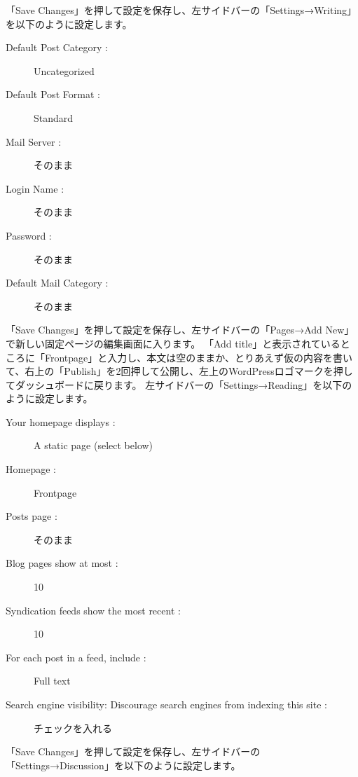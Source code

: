 \documentclass[titlepage,10pt,a4paper,uplatex]{jsbook}
\begin{document}
「Save Changes」を押して設定を保存し、左サイドバーの「Settings→Writing」を以下のように設定します。

\begin{description}
\item[Default Post Category : ] Uncategorized
\item[Default Post Format : ] Standard
\item[Mail Server : ] そのまま
\item[Login Name : ] そのまま
\item[Password : ] そのまま
\item[Default Mail Category : ] そのまま
\end{description}

「Save Changes」を押して設定を保存し、左サイドバーの「Pages→Add New」で新しい固定ページの編集画面に入ります。
「Add title」と表示されているところに「Frontpage」と入力し、本文は空のままか、とりあえず仮の内容を書いて、右上の「Publish」を2回押して公開し、左上のWordPressロゴマークを押してダッシュボードに戻ります。
左サイドバーの「Settings→Reading」を以下のように設定します。

\begin{description}
\item[Your homepage displays : ] A static page (select below)
\item[Homepage : ] Frontpage
\item[Posts page : ] そのまま
\item[Blog pages show at most : ] 10
\item[Syndication feeds show the most recent : ] 10
\item[For each post in a feed, include : ] Full text
\item[Search engine visibility: Discourage search engines from indexing this site : ] チェックを入れる
\end{description}

「Save Changes」を押して設定を保存し、左サイドバーの「Settings→Discussion」を以下のように設定します。
\end{document}
